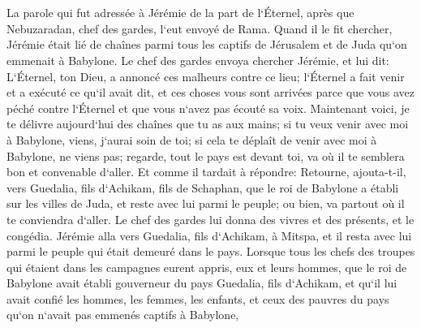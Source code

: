 \chapter{}

\verse La parole qui fut adressée à Jérémie de la part de l`Éternel, après que Nebuzaradan, chef des gardes, l`eut envoyé de Rama. Quand il le fit chercher, Jérémie était lié de chaînes parmi tous les captifs de Jérusalem et de Juda qu`on emmenait à Babylone. 
\verse Le chef des gardes envoya chercher Jérémie, et lui dit: L`Éternel, ton Dieu, a annoncé ces malheurs contre ce lieu; 
\verse l`Éternel a fait venir et a exécuté ce qu`il avait dit, et ces choses vous sont arrivées parce que vous avez péché contre l`Éternel et que vous n`avez pas écouté sa voix. 
\verse Maintenant voici, je te délivre aujourd`hui des chaînes que tu as aux mains; si tu veux venir avec moi à Babylone, viens, j`aurai soin de toi; si cela te déplaît de venir avec moi à Babylone, ne viens pas; regarde, tout le pays est devant toi, va où il te semblera bon et convenable d`aller. 
\verse Et comme il tardait à répondre: Retourne, ajouta-t-il, vers Guedalia, fils d`Achikam, fils de Schaphan, que le roi de Babylone a établi sur les villes de Juda, et reste avec lui parmi le peuple; ou bien, va partout où il te conviendra d`aller. Le chef des gardes lui donna des vivres et des présents, et le congédia. 
\verse Jérémie alla vers Guedalia, fils d`Achikam, à Mitspa, et il resta avec lui parmi le peuple qui était demeuré dans le pays. 
\verse Lorsque tous les chefs des troupes qui étaient dans les campagnes eurent appris, eux et leurs hommes, que le roi de Babylone avait établi gouverneur du pays Guedalia, fils d`Achikam, et qu`il lui avait confié les hommes, les femmes, les enfants, et ceux des pauvres du pays qu`on n`avait pas emmenés captifs à Babylone, 
